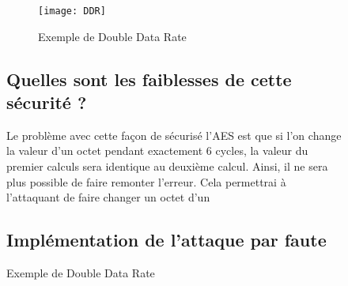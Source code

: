 \begin{figure}
\begin{figure}[htbp]
\begin{center}
\texttt{[image: DDR]}
\caption{Exemple de Double Data Rate}
\label{fig:DDR}
\end{center}
\end{figure}

\subsection{Quelles sont les faiblesses de cette sécurité ?}

Le problème avec cette façon de sécurisé l'AES est que si l'on change la valeur d'un octet pendant exactement 6 cycles, la valeur du premier calculs sera identique au deuxième calcul. 
Ainsi, il ne sera plus possible de faire remonter l'erreur. Cela permettrai à l'attaquant de faire changer un octet d'un 

\subsection{Implémentation de l'attaque par faute}


\end{figure}
